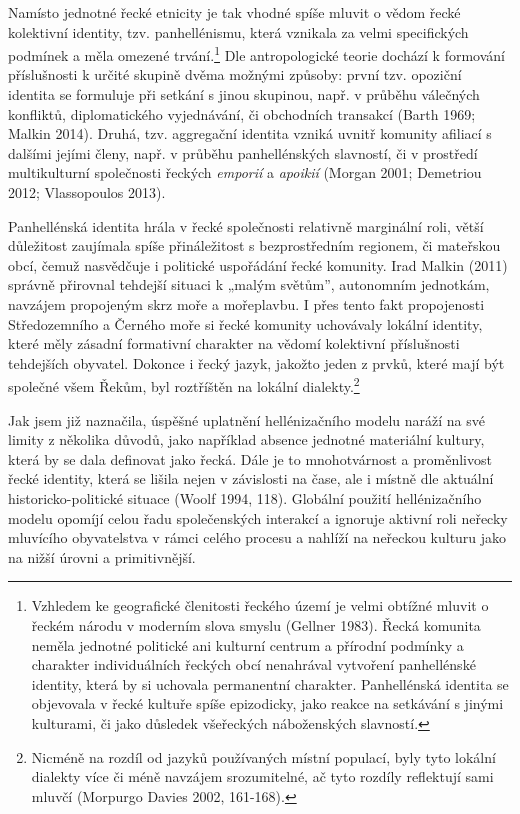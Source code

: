 Namísto jednotné řecké etnicity je tak vhodné spíše mluvit o vědom řecké kolektivní identity, tzv. panhellénismu, která vznikala za velmi specifických podmínek a měla omezené trvání.\footnote{Vzhledem ke geografické členitosti řeckého území je velmi obtížné mluvit o řeckém národu v moderním slova smyslu (Gellner 1983). Řecká komunita neměla jednotné politické ani kulturní centrum a přírodní podmínky a charakter individuálních řeckých obcí nenahrával vytvoření panhellénské identity, která by si uchovala permanentní charakter. Panhellénská identita se objevovala v řecké kultuře spíše epizodicky, jako reakce na setkávání s jinými kulturami, či jako důsledek všeřeckých náboženských slavností.} Dle antropologické teorie dochází k formování příslušnosti k určité skupině dvěma možnými způsoby: první tzv. opoziční identita se formuluje při setkání s jinou skupinou, např. v průběhu válečných konfliktů, diplomatického vyjednávání, či obchodních transakcí (Barth 1969; Malkin 2014). Druhá, tzv. aggregační identita vzniká uvnitř komunity afiliací s dalšími jejími členy, např. v průběhu panhellénských slavností, či v prostředí multikulturní společnosti řeckých {\em emporií} a {\em apoikií} (Morgan 2001; Demetriou 2012; Vlassopoulos 2013).

Panhellénská identita hrála v řecké společnosti relativně marginální roli, větší důležitost zaujímala spíše přináležitost s bezprostředním regionem, či mateřskou obcí, čemuž nasvědčuje i politické uspořádání řecké komunity. Irad Malkin (2011) správně přirovnal tehdejší situaci k „malým světům”, autonomním jednotkám, navzájem propojeným skrz moře a mořeplavbu. I přes tento fakt propojenosti Středozemního a Černého moře si řecké komunity uchovávaly lokální identity, které měly zásadní formativní charakter na vědomí kolektivní příslušnosti tehdejších obyvatel. Dokonce i řecký jazyk, jakožto jeden z prvků, které mají být společné všem Řekům, byl roztříštěn na lokální dialekty.\footnote{Nicméně na rozdíl od jazyků používaných místní populací, byly tyto lokální dialekty více či méně navzájem srozumitelné, ač tyto rozdíly reflektují sami mluvčí (Morpurgo Davies 2002, 161-168).}

Jak jsem již naznačila, úspěšné uplatnění hellénizačního modelu naráží na své limity z několika důvodů, jako například absence jednotné materiální kultury, která by se dala definovat jako řecká. Dále je to mnohotvárnost a proměnlivost řecké identity, která se lišila nejen v závislosti na čase, ale i místně dle aktuální historicko-politické situace (Woolf 1994, 118). Globální použití hellénizačního modelu opomíjí celou řadu společenských interakcí a ignoruje aktivní roli neřecky mluvícího obyvatelstva v rámci celého procesu a nahlíží na neřeckou kulturu jako na nižší úrovni a primitivnější.

